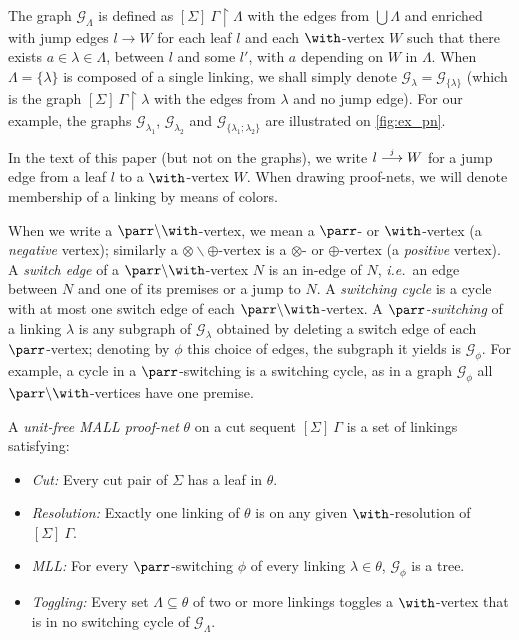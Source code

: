 \documentclass{lmcs}
\newcommand*{\tens}{\otimes} %
\newcommand*{\pw}{\parr\backslash\with} %
\newcommand*{\tp}{\tens\backslash\oplus} %
\newcommand*{\ie}{\emph{i.e.}}
\newcommand*{\G}{\mathcal{G}}
\newcommand{\symboltext}[2]{\mathrel{\overset{\makebox[0pt]{\mbox{\normalfont\tiny\sffamily \ensuremath{#1}}}}{#2}}} %
\newcommand{\jump}{\symboltext{j}{\longrightarrow}}
\begin{document}
The graph $\G_\Lambda$ is defined as $[\Sigma]~\Gamma\upharpoonright\Lambda$ with the edges from $\bigcup\Lambda$ and enriched with jump edges $l\rightarrow W$ for each leaf $l$ and each $\with$-vertex $W$ such that there exists $a\in\lambda\in\Lambda$, between $l$ and some $l'$, with $a$ depending on $W$ in $\Lambda$.
When $\Lambda=\{\lambda\}$ is composed of a single linking, we shall simply denote $\G_\lambda=\G_{\{\lambda\}}$ (which is the graph $[\Sigma]~\Gamma\upharpoonright\lambda$ with the edges from $\lambda$ and no jump edge).
For our example, the graphs $\G_{\lambda_1}$, $\G_{\lambda_2}$ and $\G_{\{\lambda_1;\lambda_2\}}$ are illustrated on \autoref{fig:ex_pn}.

In the text of this paper (but not on the graphs), we write $l\jump W$ for a jump edge from a leaf $l$ to a $\with$-vertex $W$.
When drawing proof-nets, we will denote membership of a linking by means of colors.

When we write a $\pw$-vertex, we mean a $\parr$- or $\with$-vertex (a \emph{negative} vertex); similarly a $\tp$-vertex is a $\tens$- or $\oplus$-vertex (a \emph{positive} vertex).
A \emph{switch edge} of a $\pw$-vertex $N$ is an in-edge of $N$, \ie\ an edge between $N$ and one of its premises or a jump to $N$.
A \emph{switching cycle} is a cycle with at most one switch edge of each $\pw$-vertex.
A \emph{$\parr$-switching} of a linking $\lambda$ is any subgraph of $\G_\lambda$ obtained by deleting a switch edge of each $\parr$-vertex; denoting by $\phi$ this choice of edges, the subgraph it yields is $\G_\phi$.
For example, a cycle in a $\parr$-switching is a switching cycle, as in a graph $\G_\phi$ all $\pw$-vertices have one premise.

\begin{defi}
\label{def:pn}
A \emph{unit-free MALL proof-net} $\theta$ on a cut sequent $[\Sigma]~\Gamma$ is a set of linkings satisfying:
\begin{itemize}[left=\parindent]
\item[\textbf{(P0)}] \emph{Cut:} Every cut pair of $\Sigma$ has a leaf in $\theta$.
\item[\textbf{(P1)}] \emph{Resolution:} Exactly one linking of $\theta$ is on any given $\with$-resolution of $[\Sigma]~\Gamma$.
\item[\textbf{(P2)}] \emph{MLL:} For every $\parr$-switching $\phi$ of every linking $\lambda\in\theta$, $\G_\phi$ is a tree.
\item[\textbf{(P3)}] \emph{Toggling:} Every set $\Lambda\subseteq\theta$ of two or more linkings toggles a $\with$-vertex that is in no switching cycle of $\G_\Lambda$.
\end{itemize}
\end{defi}
\end{document}
